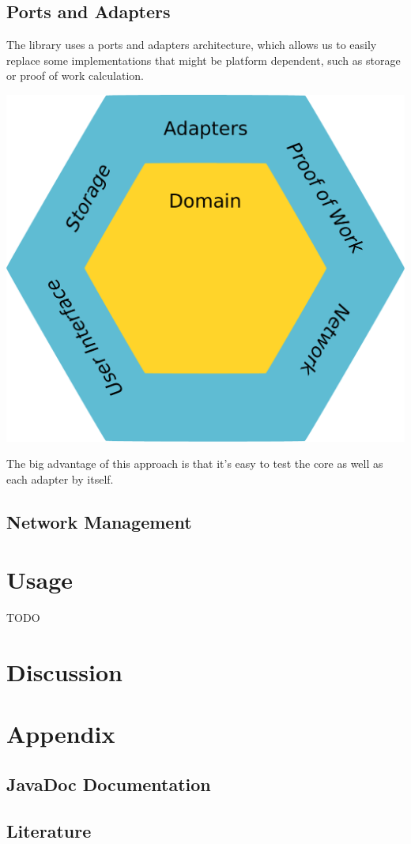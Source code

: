 \documentclass{bfh}
\begin{document}
  \subsection{Ports and Adapters}

  The library uses a ports and adapters architecture, which allows us to easily replace some implementations that might be platform dependent, such as storage or proof of work calculation.

  \includegraphics[width=\textwidth]{images/ports_and_adapters.pdf}

  The big advantage of this approach is that it's easy to test the core as well as each adapter by itself.


  \subsection{Network Management}


  \section{Usage}

  TODO


  \section{Discussion}


  \appendix
  \section*{Appendix}
  \renewcommand{\thesubsection}{\Alph{subsection}}


  \subsection{JavaDoc Documentation}


  \subsection{Literature}
\end{document}
